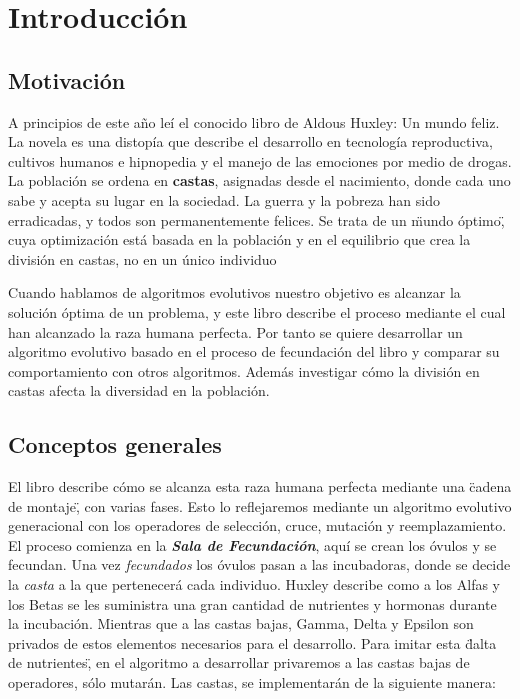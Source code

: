 \chapter{Introducción}

\section{Motivación}

A principios de este año leí el conocido libro de Aldous Huxley: Un mundo feliz. La novela es una
distopía que describe el desarrollo en tecnología reproductiva, cultivos humanos e hipnopedia y el manejo de las
emociones por medio de drogas. La población se ordena en \textbf{castas}, asignadas desde el nacimiento, donde cada uno
sabe y acepta su lugar en la sociedad. La guerra y la pobreza han sido erradicadas, y todos son permanentemente
felices. Se trata de un \"mundo óptimo\", cuya optimización está basada en la población y en el equilibrio que crea
la división en castas, no en un único individuo 

Cuando hablamos de algoritmos evolutivos nuestro objetivo es alcanzar la solución óptima de un problema, y este libro describe el 
proceso mediante el cual han alcanzado la raza humana perfecta. Por tanto se quiere desarrollar un algoritmo evolutivo basado en 
el proceso de fecundación del libro y comparar su comportamiento con otros algoritmos. Además investigar cómo la división en castas afecta 
la diversidad en la población.

\section{Conceptos generales}

El libro describe cómo se alcanza esta raza humana perfecta mediante una \"cadena de montaje\", con varias fases. Esto lo reflejaremos mediante 
un algoritmo evolutivo generacional con los operadores de selección, cruce, mutación y reemplazamiento. El proceso comienza en la \textbf{\textit{Sala de Fecundación}}, 
aquí se crean los óvulos y se fecundan. Una vez \textit{fecundados} los óvulos pasan a las incubadoras, donde se decide la \textit{casta} a la que pertenecerá cada individuo. Huxley
describe como a los Alfas y los Betas se les suministra una gran cantidad de nutrientes y hormonas durante la incubación. Mientras que a las castas bajas, Gamma, Delta y
Epsilon son privados de estos elementos necesarios para el desarrollo. Para imitar esta \"dalta de nutrientes\", en el algoritmo a desarrollar privaremos a las castas bajas de
operadores, sólo mutarán. Las castas, se implementarán de la siguiente manera: 

